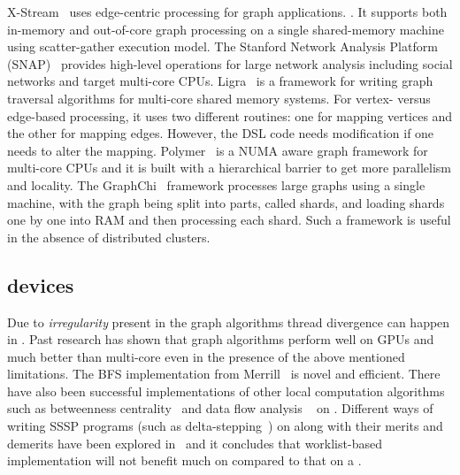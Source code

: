 X-Stream~\cite{Roy:2013:XEG:2517349.2522740}  uses edge-centric processing for graph applications.
. 
It supports both in-memory and out-of-core graph processing on a single shared-memory machine using scatter-gather execution model.
The Stanford Network Analysis Platform (SNAP)~\cite{Leskovec:2016:SGN:2973184.2898361} provides high-level operations for large network analysis including social networks and target
multi-core CPUs. 
Ligra~\cite{Shun:2013:LLG:2517327.2442530} is a framework for writing graph traversal algorithms
for multi-core shared memory systems. For vertex- versus edge-based processing, it uses two different routines: one for  mapping  vertices and the other for mapping  edges. However, the DSL code needs modification if one needs to alter the mapping.
Polymer~\cite{Zhang:2015:NGA:2858788.2688507} is a NUMA aware graph framework for multi-core CPUs and it is built
with a hierarchical barrier to get more parallelism and locality. 
The GraphChi~\cite{Kyrola:2012:GLG:2387880.2387884} framework processes large graphs using a
single machine, with the graph being split into  parts, called shards, and loading shards one by one into RAM and then processing each shard. 
Such a framework is useful in the absence of distributed clusters.

\subsection{\GPU devices}
 Due to {\it irregularity} present in the graph algorithms  thread divergence can happen in \GPU.
Past research  has shown that graph algorithms perform well on GPUs and much better than multi-core \CPU  even in the presence of   the above mentioned limitations. 
 The BFS implementation from  Merrill~\cite{Merrill:2012:SGG:2370036.2145832} is  novel and efficient. 
There have also been successful implementations of other local computation algorithms such as 
betweenness centrality~\cite{sariyuce13} and data flow analysis ~\cite{mendezlojo12}  on \GPU.
Different ways of writing SSSP programs (such as delta-stepping~\cite{meyer03}) on
\GPU along with their merits and demerits have been explored in~\cite{DAVIDSON2014} and it  concludes that worklist-based implementation will
not benefit much on \GPU compared to that on a \CPU.

